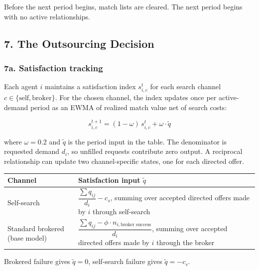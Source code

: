 \documentclass[11pt]{article}
\begin{document}
Before the next period begins, match lists are cleared. The next period begins with no active relationships.

\subsection{7. The Outsourcing Decision}\label{the-outsourcing-decision}

\subsubsection{7a. Satisfaction tracking}\label{a.-satisfaction-tracking}

Each agent \(i\) maintains a satisfaction index \(s_{i,c}^t\) for each search channel \(c \in \{\text{self}, \text{broker}\}\). For the chosen channel, the index updates once per active-demand period as an EWMA of realized match value net of search costs:

\[s_{i,c}^{t+1} = (1 - \omega)\,s_{i,c}^t + \omega \cdot \tilde{q}\]

where \(\omega = 0.2\) and \(\tilde{q}\) is the period input in the table. The denominator is requested demand \(d_i\), so unfilled requests contribute zero output. A reciprocal relationship can update two channel-specific states, one for each directed offer.

{
\begin{longtable}[]{@{}
  >{\raggedright\arraybackslash}p{}
  >{\raggedright\arraybackslash}p{}@{}}
\toprule\noalign{}
\begin{minipage}[b]{\linewidth}\raggedright
Channel
\end{minipage} & \begin{minipage}[b]{\linewidth}\raggedright
Satisfaction input \(\tilde{q}\)
\end{minipage} \\
\midrule\noalign{}
\endhead
\bottomrule\noalign{}
\endlastfoot
Self-search & \(\dfrac{\sum q_{ij}}{d_i} - c_s\), summing over accepted directed offers made by \(i\) through self-search \\
Standard brokered (base model) & \(\dfrac{\sum q_{ij} - \phi \cdot n_{i,\text{broker success}}}{d_i}\), summing over accepted directed offers made by \(i\) through the broker \\
\end{longtable}
}

Brokered failure gives \(\tilde{q}=0\), self-search failure gives \(\tilde{q}=-c_s\).
\end{document}
